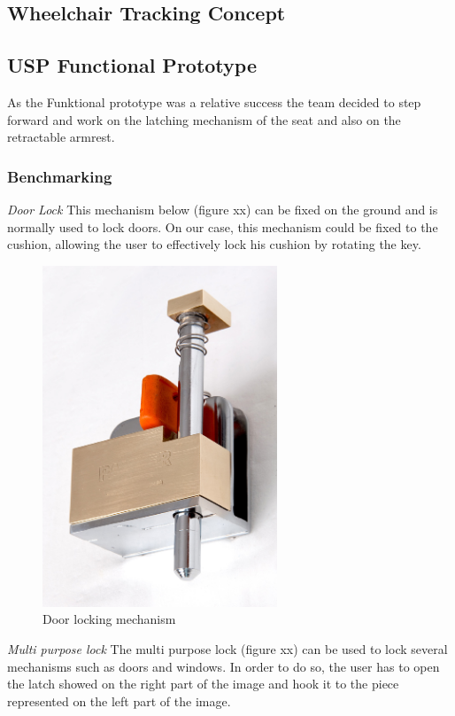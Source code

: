 \subsection{Wheelchair Tracking Concept}

\subsection{USP Functional Prototype}

As the Funktional prototype was a relative success the team decided to step forward and work on the latching mechanism of the seat and also on the retractable armrest.

\subsubsection{Benchmarking}

\emph{Door Lock}
	This mechanism below (figure xx) can be fixed on the ground and is normally used to lock doors. On our case, this mechanism could be fixed to the cushion, allowing the user to effectively lock his cushion by rotating the key.

\begin{figure}[h]
\centering
\includegraphics[width=7cm]{brazil_images/image043.png}
\caption{Door locking mechanism}
\label{fig:door_locking}
\end{figure}

\emph{Multi purpose lock}
The multi purpose lock (figure xx) can be used to lock several mechanisms such as doors and windows. In order to do so, the user has to open the latch showed on the right part of the image and hook it to the piece represented on the left part of the image.

